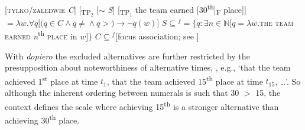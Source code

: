 \documentclass[output=paper,colorlinks,citecolor=brown]{langscibook}
\begin{document}

\ea\label{ex:tom:87}
\ea\label{ex:tom:87a} 
{}[\textsc{tylko/zaledwie} \textit{C}] [\textsubscript{TP$_2$} [$\sim$ \textit{S}] [\textsubscript{TP$_1$} the team earned [30\textsuperscript{th}]\textsubscript{F} place]]
\ex\label{ex:tom:87b}      
${} = λw.\forall q [(q\in C\wedge q\neq{}$${}\wedge q >{}$$) → ¬q(w)]$
\ex\label{ex:tom:87c}      
$S\subseteq{}$$^f = \{q:\exists n\in ℕ [q = λw.{}$\textsc{the team earned} \textit{n}\textsuperscript{th} \textsc{place} in $w]\}$
\ex\label{ex:tom:87d} 
$C\subseteq{}$$^f$\hfill [focus association; see ]
\z\z 

\noindent With \textit{dopiero} the excluded alternatives are further restricted by the presupposition about noteworthiness of alternative times, , e.g., ‘that the team achieved 1\textsuperscript{st} place at time $t_1$, that the team achieved 15\textsuperscript{th} place at time $t_{15}$, …’. So although the inherent ordering between numerals is such that 30 $>$ 15, the context defines the scale where achieving 15\textsuperscript{th} is a stronger alternative than achieving 30\textsuperscript{th} place. 
\end{document}
